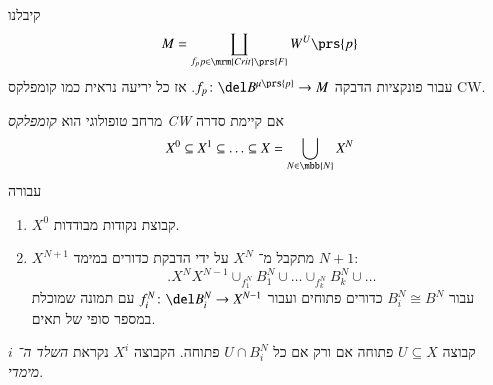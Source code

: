 \documentclass[a4paper,10pt,twoside,openany]{book}
\begin{document}

קיבלנו
\[M = \coprod_{\substack{f_p}{p \in \mrm{Crit}\prs{F}}} W^U\prs{p}\]
עבור פונקציות הדבקה
$f_p \colon \del B^{\mu\prs{p}} \to M$.
אז כל יריעה נראית כמו קומפלקס CW.

\begin{definition}
מרחב טופולוגי הוא
\emph{קומפלקס \textenglish{CW}}
אם קיימת סדרה
\begin{align*}
X^0 \subseteq X^1 \subseteq \ldots \subseteq X = \bigcup_{N \in \mbb{N}} X^N
\end{align*}
עבורה
\begin{enumerate}[label = (\roman*)]
\item $X^0$
קבוצת נקודות מבודדות.
\item $X^{N+1}$
מתקבל מ־%
$X^N$
על ידי הדבקת כדורים במימד
$N+1$:
\[\text{.} X^{N} X^{N-1} \cup_{f_1^N} B_1^N \cup \ldots \cup_{f_k^N} B_k^N \cup \ldots\]
עבור
$B_i^N \cong B^N$
כדורים פתוחים ועבור
$f_i^N \colon \del B_i^N \to X^{N-1}$
עם תמונה שמוכלת במספר סופי של תאים.
\end{enumerate}

קבוצה
$U \subseteq X$
פתוחה אם ורק אם כל
$U \cap B_i^N$
פתוחה. הקבוצה
$X^i$
נקראת
\emph{השלד ה־%
$i$
מימדי}.
\end{definition}
\end{document}
